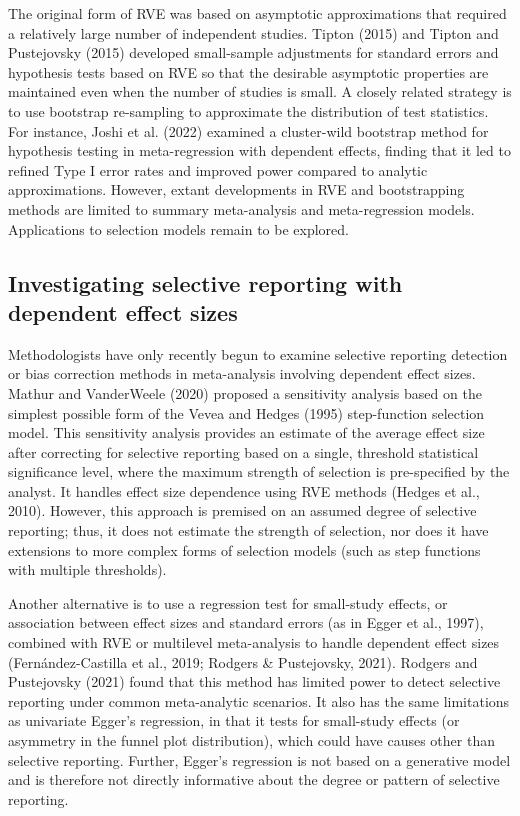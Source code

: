 \documentclass[
  american,
  man, donotrepeattitle,floatsintext]{apa7}
\begin{document}
The original form of RVE was based on asymptotic approximations that required a relatively large number of independent studies.
Tipton (2015) and Tipton and Pustejovsky (2015) developed small-sample adjustments for standard errors and hypothesis tests based on RVE so that the desirable asymptotic properties are maintained even when the number of studies is small.
A closely related strategy is to use bootstrap re-sampling to approximate the distribution of test statistics.
For instance, Joshi et al. (2022) examined a cluster-wild bootstrap method for hypothesis testing in meta-regression with dependent effects, finding that it led to refined Type I error rates and improved power compared to analytic approximations.
However, extant developments in RVE and bootstrapping methods are limited to summary meta-analysis and meta-regression models.
Applications to selection models remain to be explored.

\subsection{Investigating selective reporting with dependent effect sizes}\label{investigating-selective-reporting-with-dependent-effect-sizes}

Methodologists have only recently begun to examine selective reporting detection or bias correction methods in meta-analysis involving dependent effect sizes.
Mathur and VanderWeele (2020) proposed a sensitivity analysis based on the simplest possible form of the Vevea and Hedges (1995) step-function selection model.
This sensitivity analysis provides an estimate of the average effect size after correcting for selective reporting based on a single, threshold statistical significance level, where the maximum strength of selection is pre-specified by the analyst. It handles effect size dependence using RVE methods (Hedges et al., 2010).
However, this approach is premised on an assumed degree of selective reporting; thus, it does not estimate the strength of selection, nor does it have extensions to more complex forms of selection models (such as step functions with multiple thresholds).

Another alternative is to use a regression test for small-study effects, or association between effect sizes and standard errors (as in Egger et al., 1997), combined with RVE or multilevel meta-analysis to handle dependent effect sizes (Fernández-Castilla et al., 2019; Rodgers \& Pustejovsky, 2021).
Rodgers and Pustejovsky (2021) found that this method has limited power to detect selective reporting under common meta-analytic scenarios.
It also has the same limitations as univariate Egger's regression, in that it tests for small-study effects (or asymmetry in the funnel plot distribution), which could have causes other than selective reporting.
Further, Egger's regression is not based on a generative model and is therefore not directly informative about the degree or pattern of selective reporting.
\end{document}

